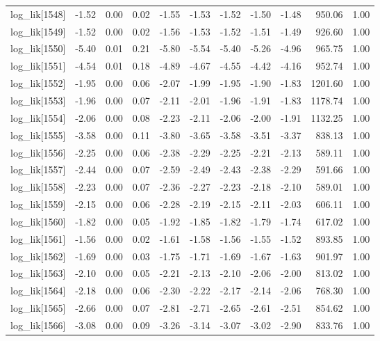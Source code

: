 \begin{table}[ht]
\begin{tabular}{rrrrrrrrrrr}
  log\_lik[1548] & -1.52 & 0.00 & 0.02 & -1.55 & -1.53 & -1.52 & -1.50 & -1.48 & 950.06 & 1.00 \\ 
  log\_lik[1549] & -1.52 & 0.00 & 0.02 & -1.56 & -1.53 & -1.52 & -1.51 & -1.49 & 926.60 & 1.00 \\ 
  log\_lik[1550] & -5.40 & 0.01 & 0.21 & -5.80 & -5.54 & -5.40 & -5.26 & -4.96 & 965.75 & 1.00 \\ 
  log\_lik[1551] & -4.54 & 0.01 & 0.18 & -4.89 & -4.67 & -4.55 & -4.42 & -4.16 & 952.74 & 1.00 \\ 
  log\_lik[1552] & -1.95 & 0.00 & 0.06 & -2.07 & -1.99 & -1.95 & -1.90 & -1.83 & 1201.60 & 1.00 \\ 
  log\_lik[1553] & -1.96 & 0.00 & 0.07 & -2.11 & -2.01 & -1.96 & -1.91 & -1.83 & 1178.74 & 1.00 \\ 
  log\_lik[1554] & -2.06 & 0.00 & 0.08 & -2.23 & -2.11 & -2.06 & -2.00 & -1.91 & 1132.25 & 1.00 \\ 
  log\_lik[1555] & -3.58 & 0.00 & 0.11 & -3.80 & -3.65 & -3.58 & -3.51 & -3.37 & 838.13 & 1.00 \\ 
  log\_lik[1556] & -2.25 & 0.00 & 0.06 & -2.38 & -2.29 & -2.25 & -2.21 & -2.13 & 589.11 & 1.00 \\ 
  log\_lik[1557] & -2.44 & 0.00 & 0.07 & -2.59 & -2.49 & -2.43 & -2.38 & -2.29 & 591.66 & 1.00 \\ 
  log\_lik[1558] & -2.23 & 0.00 & 0.07 & -2.36 & -2.27 & -2.23 & -2.18 & -2.10 & 589.01 & 1.00 \\ 
  log\_lik[1559] & -2.15 & 0.00 & 0.06 & -2.28 & -2.19 & -2.15 & -2.11 & -2.03 & 606.11 & 1.00 \\ 
  log\_lik[1560] & -1.82 & 0.00 & 0.05 & -1.92 & -1.85 & -1.82 & -1.79 & -1.74 & 617.02 & 1.00 \\ 
  log\_lik[1561] & -1.56 & 0.00 & 0.02 & -1.61 & -1.58 & -1.56 & -1.55 & -1.52 & 893.85 & 1.00 \\ 
  log\_lik[1562] & -1.69 & 0.00 & 0.03 & -1.75 & -1.71 & -1.69 & -1.67 & -1.63 & 901.97 & 1.00 \\ 
  log\_lik[1563] & -2.10 & 0.00 & 0.05 & -2.21 & -2.13 & -2.10 & -2.06 & -2.00 & 813.02 & 1.00 \\ 
  log\_lik[1564] & -2.18 & 0.00 & 0.06 & -2.30 & -2.22 & -2.17 & -2.14 & -2.06 & 768.30 & 1.00 \\ 
  log\_lik[1565] & -2.66 & 0.00 & 0.07 & -2.81 & -2.71 & -2.65 & -2.61 & -2.51 & 854.62 & 1.00 \\ 
  log\_lik[1566] & -3.08 & 0.00 & 0.09 & -3.26 & -3.14 & -3.07 & -3.02 & -2.90 & 833.76 & 1.00 \\ 

\end{tabular}
\end{table}
